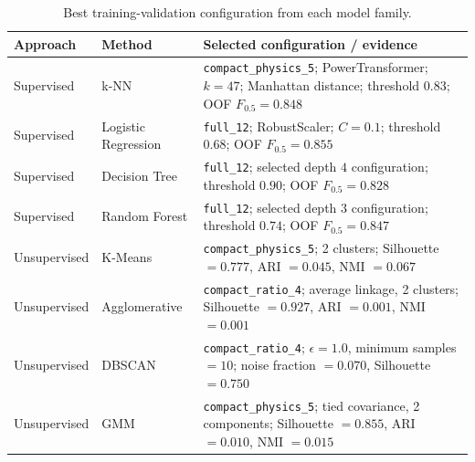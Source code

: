 \begin{table}[htbp]
\centering\footnotesize
\caption{Best training-validation configuration from each model family.}
\label{tab:models}
\begin{tabularx}{\linewidth}{@{}l l X@{}}
\toprule
Approach & Method & Selected configuration / evidence \\
\midrule
Supervised & k-NN &
\texttt{compact\_physics\_5}; PowerTransformer; $k=47$;
Manhattan distance; threshold $0.83$; OOF $F_{0.5}=0.848$ \\

Supervised & Logistic Regression &
\texttt{full\_12}; RobustScaler; $C=0.1$;
threshold $0.68$; OOF $F_{0.5}=0.855$ \\

Supervised & Decision Tree &
\texttt{full\_12}; selected depth $4$ configuration;
threshold $0.90$; OOF $F_{0.5}=0.828$ \\

Supervised & Random Forest &
\texttt{full\_12}; selected depth $3$ configuration;
threshold $0.74$; OOF $F_{0.5}=0.847$ \\

Unsupervised & K-Means &
\texttt{compact\_physics\_5}; 2 clusters;
Silhouette $=0.777$, ARI $=0.045$, NMI $=0.067$ \\

Unsupervised & Agglomerative &
\texttt{compact\_ratio\_4}; average linkage, 2 clusters;
Silhouette $=0.927$, ARI $=0.001$, NMI $=0.001$ \\

Unsupervised & DBSCAN &
\texttt{compact\_ratio\_4}; $\epsilon=1.0$, minimum samples $=10$;
noise fraction $=0.070$, Silhouette $=0.750$ \\

Unsupervised & GMM &
\texttt{compact\_physics\_5}; tied covariance, 2 components;
Silhouette $=0.855$, ARI $=0.010$, NMI $=0.015$ \\
\bottomrule
\end{tabularx}
\end{table}
